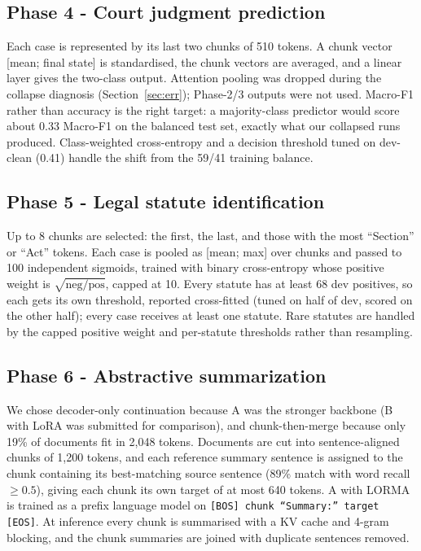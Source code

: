 \documentclass[11pt, oneside]{article}
\newcommand{\A}{\textsf{A}}\newcommand{\B}{\textsf{B}}\newcommand{\C}{\textsf{C}}\newcommand{\D}{\textsf{D}}
\begin{document}
\subsection{Phase 4 - Court judgment prediction}
Each case is represented by its last two chunks of 510 tokens. A chunk vector [mean; final state] is standardised, the chunk vectors are averaged, and a linear layer gives the two-class output. Attention pooling was dropped during the collapse diagnosis (Section~\ref{sec:err}); Phase-2/3 outputs were not used. Macro-F1 rather than accuracy is the right target: a majority-class predictor would score about 0.33 Macro-F1 on the balanced test set, exactly what our collapsed runs produced. Class-weighted cross-entropy and a decision threshold tuned on dev-clean (0.41) handle the shift from the 59/41 training balance.

\subsection{Phase 5 - Legal statute identification}
Up to 8 chunks are selected: the first, the last, and those with the most ``Section'' or ``Act'' tokens. Each case is pooled as [mean; max] over chunks and passed to 100 independent sigmoids, trained with binary cross-entropy whose positive weight is $\sqrt{\text{neg}/\text{pos}}$, capped at 10. Every statute has at least 68 dev positives, so each gets its own threshold, reported cross-fitted (tuned on half of dev, scored on the other half); every case receives at least one statute. Rare statutes are handled by the capped positive weight and per-statute thresholds rather than resampling.

\subsection{Phase 6 - Abstractive summarization}
We chose decoder-only continuation because \A{} was the stronger backbone (\B{} with LoRA was submitted for comparison), and chunk-then-merge because only 19\% of documents fit in 2,048 tokens. Documents are cut into sentence-aligned chunks of 1,200 tokens, and each reference summary sentence is assigned to the chunk containing its best-matching source sentence (89\% match with word recall $\geq0.5$), giving each chunk its own target of at most 640 tokens. \A{} with LORMA is trained as a prefix language model on \texttt{[BOS] chunk ``Summary:'' target [EOS]}. At inference every chunk is summarised with a KV cache and 4-gram blocking, and the chunk summaries are joined with duplicate sentences removed.
\end{document}

